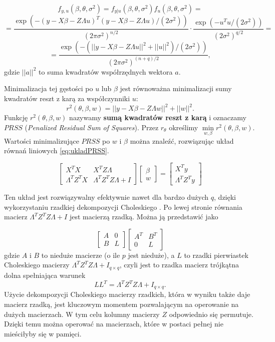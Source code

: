 \documentclass[12pt]{mwbk}
\theoremstyle{plain}
\theoremstyle{definition}
\theoremstyle{definition}
\begin{document}
$$f_{y,u}(\beta, \theta, \sigma^2)=f_{y|u}(\beta, \theta, \sigma^2)f_u(\beta, \theta, \sigma^2)=$$
$$=\frac{\exp(-(y-X\beta -Z \Lambda u)^T(y-X\beta-Z\Lambda u)/(2\sigma^2))}{(2\pi \sigma^2)^{n/2}}\cdot \frac{\exp(-u^Tu/(2\sigma^2))}{(2\sigma^2)^{q/2}}=$$
$$=\frac{\exp(-(||y-X\beta-Z\Lambda u||^2+||u||^2)/(2\sigma^2))}{(2\pi \sigma^2)^{(n+q)/2}},$$ gdzie $||a||^2$ to suma kwadratów współrzędnych wektora $a$.

Minimalizacja tej gęstości po $u$ lub $\beta$ jest równoważna minimalizacji sumy kwadratów reszt z karą za współczynniki $u$:
$$r^2(\theta, \beta, w)=||y-X\beta-Z\Lambda w||^2+||w||^2.$$ Funkcję $r^2(\theta, \beta, w)$ nazywamy \textbf{sumą kwadratów reszt z karą} i oznaczamy $PRSS$ (\textit{Penalized Residual Sum of Squares}). Przez $r_{\theta}$ określimy $\min\limits_{w,\beta} r^2(\theta, \beta,w)$. Wartości minimalizujące $PRSS$ po $w$ i $\beta$ można znaleźć, rozwiązując układ równań liniowych \ref{eq:ukladPRSS}.

\begin{equation} \label{eq:ukladPRSS}
\begin{bmatrix}
X^TX & X^TZ\Lambda \\
\Lambda^TZ^TX & \Lambda^TZ^TZ\Lambda +I
\end{bmatrix}
\begin{bmatrix}
\beta \\
w
\end{bmatrix}=
\begin{bmatrix}
X^Ty\\
\Lambda^TZ^Ty
\end{bmatrix}
\end{equation}

Ten układ jest rozwiązywalny efektywnie nawet dla bardzo dużych $q$, dzięki wykorzystaniu rzadkiej dekompozycji Choleskiego \cite{cholesky}. Po lewej stronie równania macierz $\Lambda^TZ^TZ\Lambda+I$ jest macierzą rzadką. Można ją przedstawić jako

$$\begin{bmatrix}
A & 0 \\
B & L
\end{bmatrix}
\begin{bmatrix}
A^T & B^T\\
0 & L
\end{bmatrix}
$$
gdzie $A$ i $B$ to nieduże macierze (o ile $p$ jest nieduże), a $L$ to rzadki pierwiastek Choleskiego macierzy $\Lambda^TZ^TZ\Lambda+I_{q\times q}$, czyli jest to rzadka macierz trójkątna dolna spełniająca warunek $$LL^T=\Lambda^TZ^TZ\Lambda +I_{q \times q}.$$ Użycie dekompozycji Choleskiego macierzy rzadkich, która w wyniku także daje macierz rzadką, jest kluczowym momentem pozwalającym na operowanie na dużych macierzach. W tym celu kolumny macierzy $Z$ odpowiednio się permutuje. Dzięki temu można operować na macierzach, które w postaci pełnej nie mieściłyby się w pamięci.
\end{document}
